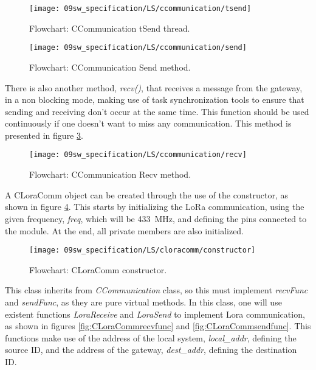 \begin{figure}[H]
	\centering
	\texttt{[image: 09sw\_specification/LS/ccommunication/tsend]}
	\caption{Flowchart: CCommunication tSend thread.}
	\label{fig:CCommunicationtsend}
\end{figure}

\begin{figure}[H]
	\centering
	\texttt{[image: 09sw\_specification/LS/ccommunication/send]}
	\caption{Flowchart: CCommunication Send method.}
	\label{fig:CCommunicationsend}
\end{figure}

\clearpage
There is also another method, \textit{recv()}, that receives a message from the gateway, in a non blocking mode, making use of task synchronization tools to ensure that sending and receiving don't occur at the same time. This function should be used continuously if one doesn't want to miss any communication. This method is presented in figure \ref{fig:CCommunicationrecv}.

\begin{figure}[H]
	\centering
	\texttt{[image: 09sw\_specification/LS/ccommunication/recv]}
	\caption{Flowchart: CCommunication Recv method.}
	\label{fig:CCommunicationrecv}
\end{figure}

\clearpage
{}

A CLoraComm object can be created through the use of the constructor, as shown in figure \ref{fig:LoraComm}.
This starts by initializing the LoRa communication, using the given frequency, \textit{freq}, which will be 433~MHz, and defining the pins connected to the module. At the end, all private members are also initialized.

\begin{figure}[H]
	\centering
	\texttt{[image: 09sw\_specification/LS/cloracomm/constructor]}
	\caption{Flowchart: CLoraComm constructor.}
	\label{fig:LoraComm}
\end{figure}

This class inherits from \textit{CCommunication} class, so this must implement \textit{recvFunc} and \textit{sendFunc}, as they are pure virtual methods. In this class, one will use existent functions \textit{LoraReceive} and \textit{LoraSend} to implement Lora communication, as shown in figures \ref{fig:CLoraCommrecvfunc} and \ref{fig:CLoraCommsendfunc}. This functions make use of the address of the local system, \textit{local\_addr}, defining the source ID, and the address of the gateway, \textit{dest\_addr}, defining the destination ID.

